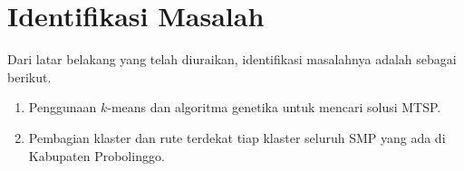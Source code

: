 \section{Identifikasi Masalah}

Dari latar belakang yang telah diuraikan,
identifikasi masalahnya adalah sebagai berikut.
\begin{enumerate}
	\item Penggunaan $k$-means dan algoritma genetika untuk mencari solusi MTSP.
	\item Pembagian klaster dan rute terdekat tiap klaster seluruh SMP yang ada di Kabupaten Probolinggo.
\end{enumerate}